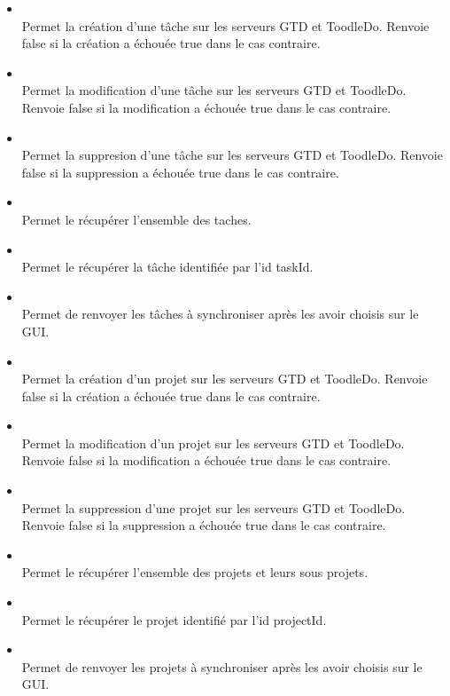 \begin{itemize}


	\item {} \\
	Permet la création  d'une tâche sur les serveurs GTD et ToodleDo. Renvoie false si la création a échouée true dans le cas contraire.
	\item {} \\
	Permet la modification d'une tâche sur les serveurs GTD et ToodleDo. Renvoie false si la modification a échouée true dans le cas contraire.
	\item {} \\
	Permet la suppresion d'une tâche sur les serveurs GTD et ToodleDo. Renvoie false si la suppression a échouée true dans le cas contraire.
	\item {} \\
	Permet le récupérer l'ensemble des taches.
	\item {} \\
	Permet le récupérer la tâche identifiée par l'id taskId.
	\item {} \\
	Permet de renvoyer les tâches à synchroniser après les avoir choisis sur le GUI.

	\item {} \\
	Permet la création d'un projet sur les serveurs GTD et ToodleDo. Renvoie false si la création a échouée true dans le cas contraire.
	\item {} \\
	Permet la modification d'un projet sur les serveurs GTD et ToodleDo. Renvoie false si la modification a échouée true dans le cas contraire.
	\item {} \\
	Permet la suppression d'une projet sur les serveurs GTD et ToodleDo. Renvoie false si la suppression a échouée true dans le cas contraire.
	\item {} \\
	Permet le récupérer l'ensemble des projets et leurs sous projets.
	\item {} \\
	Permet le récupérer le projet identifié par l'id projectId.
	\item {} \\
	Permet de renvoyer les projets à synchroniser après les avoir choisis sur le GUI.



\end{itemize}
